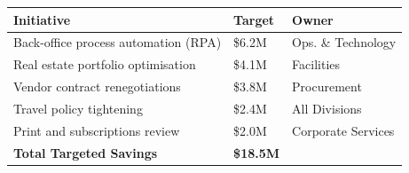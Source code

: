\begin{tcolorbox}[
  enhanced,
  colback=CoolGray,
  colframe=GoldHighlight,
  boxrule=0.8pt,
  arc=4pt,
  title={\faChartLine\; FY 2025 Cost Efficiency Programme — Target: \$18.5M in Savings},
  fonttitle=\bfseries\color{NavyPrimary}\small,
  attach boxed title to top left={yshift=-2mm, xshift=6pt},
  boxed title style={colback=GoldHighlight!20, colframe=GoldHighlight, boxrule=0.6pt, arc=3pt}
]
\vspace{2pt}
\renewcommand{\arraystretch}{1.25}
\begin{tabular}{L{6.8cm} R{2.2cm} R{2.8cm}}
  \toprule
  \textbf{Initiative} & \textbf{Target} & \textbf{Owner} \\
  \midrule
  Back-office process automation (RPA) & \$6.2M & Ops. \& Technology \\
  Real estate portfolio optimisation   & \$4.1M & Facilities \\
  Vendor contract renegotiations       & \$3.8M & Procurement \\
  Travel policy tightening             & \$2.4M & All Divisions \\
  Print and subscriptions review       & \$2.0M & Corporate Services \\
  \midrule
  \textbf{Total Targeted Savings}      & \textbf{\$18.5M} & \\
  \bottomrule
\end{tabular}
\end{tcolorbox}
